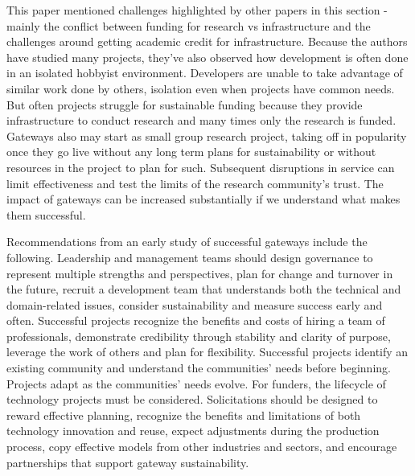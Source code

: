 \documentclass[11pt, oneside]{amsart}
\begin{document}
This paper mentioned challenges highlighted by other papers in this section -
mainly the conflict between funding for research vs infrastructure and the
challenges around getting academic credit for infrastructure. Because the
authors have studied many projects, they've also observed how development is
often done in an isolated hobbyist environment. Developers are unable to take
advantage of similar work done by others, isolation even when projects have
common needs. But often projects struggle for sustainable funding because they
provide infrastructure to conduct research and many times only the research is
funded. Gateways also may start as small group research project, taking off in
popularity once they go live without any long term plans for sustainability or
without resources in the project to plan for such. Subsequent disruptions in
service can limit effectiveness and test the limits of the research community's
trust. The impact of gateways can be increased substantially if we understand
what makes them successful.

Recommendations from an early study of successful gateways include the
following. Leadership and management teams should design governance to
represent multiple strengths and perspectives, plan for change and turnover in
the future, recruit a development team that understands both the technical and
domain-related issues, consider sustainability and measure success early and
often. Successful projects recognize the benefits and costs of hiring a team of
professionals, demonstrate credibility through stability and clarity of
purpose, leverage the work of others and plan for flexibility. Successful
projects identify an existing community and understand the communities' needs
before beginning. Projects adapt as the communities' needs evolve. For funders,
the lifecycle of technology projects must be considered. Solicitations should
be designed to reward effective planning, recognize the benefits and
limitations of both technology innovation and reuse, expect adjustments during
the production process, copy effective models from other industries and
sectors, and encourage partnerships that support gateway sustainability.
\end{document}
